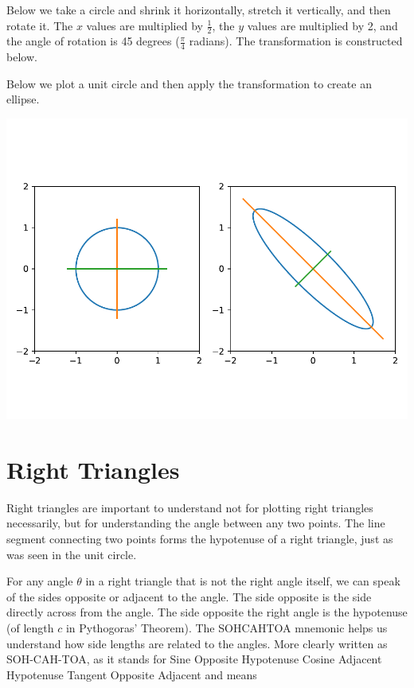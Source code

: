 Below we take a circle and shrink it horizontally, stretch it vertically, and then rotate it. The $x$ values are multiplied by $\frac{1}{2}$, the $y$ values are multiplied by 2, and the angle of rotation is 45 degrees ($\frac{\pi}{4}$ radians). The transformation is constructed below. 


Below we plot a unit circle and then apply the transformation to create an ellipse.


\begin{center}
    \includegraphics[width = .7\textwidth]{figures/mathplots/ellipse-tform.pdf}
\end{center}



\section{Right Triangles}

Right triangles are important to understand not for plotting right triangles necessarily, but for understanding the angle between any two points. The line segment connecting two points forms the hypotenuse of a right triangle, just as was seen in the unit circle. 

For any angle $\theta$ in a right triangle that is not the right angle itself, we can speak of the sides opposite or adjacent to the angle. The side opposite is the side directly across from the angle. The side opposite the right angle is the hypotenuse (of length $c$ in Pythogoras' Theorem). The SOHCAHTOA mnemonic helps us understand how side lengths are related to the angles. More clearly written as SOH-CAH-TOA, as it stands for Sine Opposite Hypotenuse Cosine Adjacent Hypotenuse Tangent Opposite Adjacent and means 

